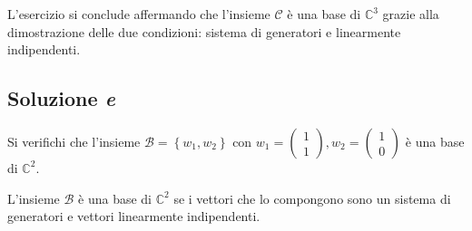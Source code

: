 \documentclass[a4paper]{article}
\begin{document}
	\noindent
	L'esercizio si conclude affermando che l'insieme $\mathscr{C}$ è una base di $\mathbb{C}^{3}$ grazie alla dimostrazione delle due condizioni: sistema di generatori e linearmente indipendenti.\newpage
	
	\subsection{Soluzione \emph{e}}
	
	Si verifichi che l'insieme $\mathscr{B} = \left\{w_{1}, w_{2}\right\}$ con $w_{1} = \begin{pmatrix}
		1 \\ 1
	\end{pmatrix}, w_{2} = \begin{pmatrix}
		1 \\ 0
	\end{pmatrix}$ è una base di $\mathbb{C}^{2}$.\newline
	
	\noindent
	L'insieme $\mathscr{B}$ è una base di $\mathbb{C}^{2}$ se i vettori che lo compongono sono un sistema di generatori e vettori linearmente indipendenti.
	
\end{document}
